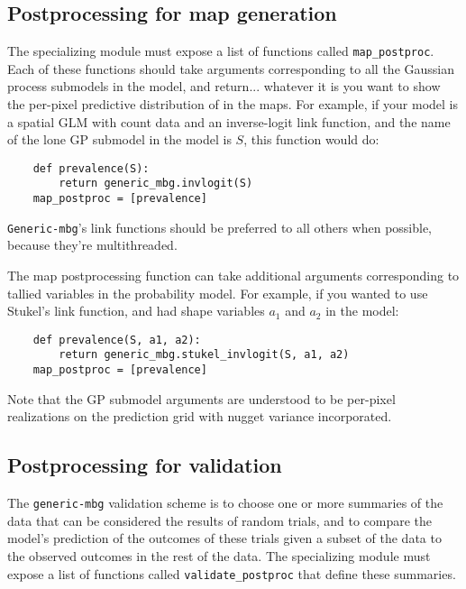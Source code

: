 \subsection{Postprocessing for map generation}
The specializing module must expose a list of functions called \texttt{map\_postproc}. Each of these functions should take arguments corresponding to all the Gaussian process submodels in the model, and return... whatever it is you want to show the per-pixel predictive distribution of in the maps. For example, if your model is a spatial GLM with count data and an inverse-logit link function, and the name of the lone GP submodel in the model is $S$, this function would do:
\begin{verbatim}
    def prevalence(S):
        return generic_mbg.invlogit(S)
    map_postproc = [prevalence]
\end{verbatim}
\texttt{Generic-mbg}'s link functions should be preferred to all others when possible, because they're multithreaded.

The map postprocessing function can take additional arguments corresponding to tallied variables in the probability model. For example, if you wanted to use Stukel's link function, and had shape variables $a_1$ and $a_2$ in the model:
\begin{verbatim}
    def prevalence(S, a1, a2):
        return generic_mbg.stukel_invlogit(S, a1, a2)
    map_postproc = [prevalence]
\end{verbatim}
Note that the GP submodel arguments are understood to be per-pixel realizations on the prediction grid with nugget variance incorporated.

\subsection{Postprocessing for validation} 
The \texttt{generic-mbg} validation scheme is to choose one or more summaries of the data that can be considered the results of random trials, and to compare the model's prediction of the outcomes of these trials given a subset of the data to the observed outcomes in the rest of the data. The specializing module must expose a list of functions called \texttt{validate\_postproc} that define these summaries. 

